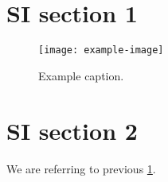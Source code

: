 
\section{SI section 1}

\lipsum[1]{}\citep{example}

\begin{figure}[htb]
    \centering
    \texttt{[image: example-image]}
    \caption{%
        Example caption.
    }\label{fig:caption-si}
\end{figure}

\lipsum[5]{}

\section{SI section 2}

We are referring to previous \cref{fig:caption-si}.

\lipsum[5]{}
